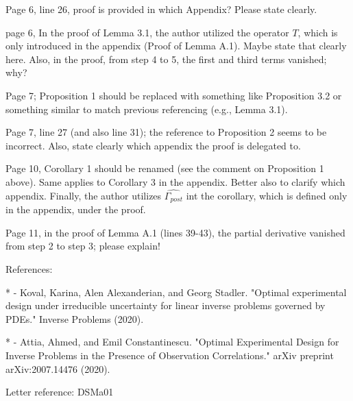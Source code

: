 \documentclass{amsart}
\begin{document}
Page 6, line 26, proof is provided in which Appendix? Please state
clearly.

page 6, In the proof of Lemma 3.1, the author utilized the operator
$T$, which is only introduced in the appendix (Proof of Lemma
A.1). Maybe state that clearly here. Also, in the proof, from step 4
to 5, the first and third terms vanished; why?

Page 7; Proposition 1 should be replaced with something like
Proposition 3.2 or something similar to match previous referencing
(e.g., Lemma 3.1).

Page 7, line 27 (and also line 31); the reference to Proposition 2
seems to be incorrect. Also, state clearly which appendix the proof is
delegated to.

Page 10, Corollary 1 should be renamed (see the comment on Proposition
1 above). Same applies to Corollary 3 in the appendix. Better also to
clarify which appendix. Finally, the author utilizes
$\widehat{\Gamma_{post}}$ int the corollary, which is defined only in
the appendix, under the proof.


Page 11, in the proof of Lemma A.1 (lines 39-43), the partial
derivative vanished from step 2 to step 3; please explain!


References:

* - Koval, Karina, Alen Alexanderian, and Georg
Stadler. "Optimal experimental design under irreducible uncertainty
for linear inverse problems governed by PDEs." Inverse Problems
(2020).

* - Attia, Ahmed, and Emil Constantinescu. "Optimal Experimental
Design for Inverse Problems in the Presence of Observation
Correlations." arXiv preprint arXiv:2007.14476 (2020).

Letter reference: DSMa01
\end{document}
